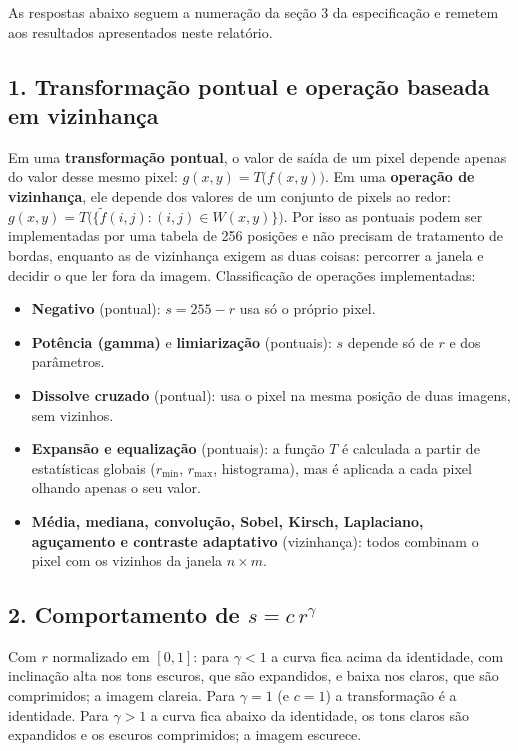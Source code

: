 \documentclass[11pt,a4paper]{article}
\begin{document}
As respostas abaixo seguem a numeração da seção 3 da especificação e remetem aos resultados
apresentados neste relatório.

\subsection*{1. Transformação pontual e operação baseada em vizinhança}

Em uma \textbf{transformação pontual}, o valor de saída de um pixel depende apenas do valor
desse mesmo pixel: $g(x,y) = T\big(f(x,y)\big)$. Em uma \textbf{operação de vizinhança}, ele
depende dos valores de um conjunto de pixels ao redor:
$g(x,y) = T\big(\{\tilde f(i,j) : (i,j) \in W(x,y)\}\big)$. Por isso as pontuais podem ser
implementadas por uma tabela de 256 posições e não precisam de tratamento de bordas, enquanto
as de vizinhança exigem as duas coisas: percorrer a janela e decidir o que ler fora da imagem.
Classificação de operações implementadas:
\begin{itemize}
  \item \textbf{Negativo} (pontual): $s = 255 - r$ usa só o próprio pixel.
  \item \textbf{Potência (gamma)} e \textbf{limiarização} (pontuais): $s$ depende só de $r$ e dos
        parâmetros.
  \item \textbf{Dissolve cruzado} (pontual): usa o pixel na mesma posição de duas imagens, sem
        vizinhos.
  \item \textbf{Expansão e equalização} (pontuais): a função $T$ é calculada a partir de
        estatísticas globais ($r_{\min}$, $r_{\max}$, histograma), mas é aplicada a cada pixel
        olhando apenas o seu valor.
  \item \textbf{Média, mediana, convolução, Sobel, Kirsch, Laplaciano, aguçamento e contraste
        adaptativo} (vizinhança): todos combinam o pixel com os vizinhos da janela $n \times m$.
\end{itemize}

\subsection*{2. Comportamento de $s = c\,r^{\gamma}$}

Com $r$ normalizado em $[0,1]$: para $\gamma < 1$ a curva fica acima da identidade, com
inclinação alta nos tons escuros, que são expandidos, e baixa nos claros, que são comprimidos;
a imagem clareia. Para $\gamma = 1$ (e $c = 1$) a transformação é a identidade. Para
$\gamma > 1$ a curva fica abaixo da identidade, os tons claros são expandidos e os escuros
comprimidos; a imagem escurece.
\end{document}
